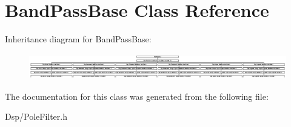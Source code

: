 \hypertarget{classBandPassBase}{\section{Band\-Pass\-Base Class Reference}
\label{classBandPassBase}
}
Inheritance diagram for Band\-Pass\-Base\-:\begin{figure}[H]
\begin{center}
\leavevmode
\includegraphics[height=1.126761cm]{classBandPassBase}
\end{center}
\end{figure}


The documentation for this class was generated from the following file\-:\begin{DoxyCompactItemize}
\item 
Dsp/Pole\-Filter.\-h\end{DoxyCompactItemize}

